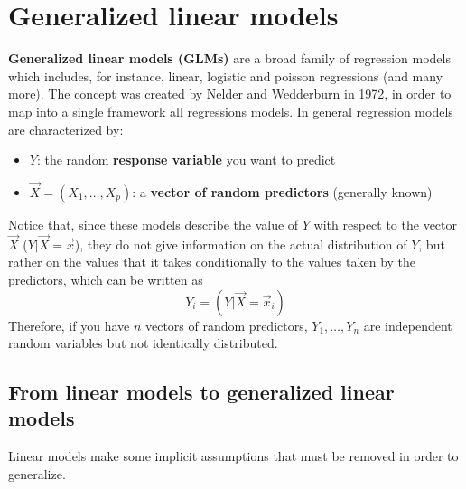 \chapter{Generalized linear models}
  \textbf{Generalized linear models (GLMs)} are a broad family of regression models which includes, for instance, linear, logistic and poisson regressions (and many more). The concept was created by Nelder and Wedderburn in 1972, in order to map into a single framework all regressions models.
  In general regression models are characterized by:
  \begin{itemize}
    \item $Y$: the random \textbf{response variable} you want to predict
    \item $\vec{X}=(X_1, \dots, X_p)$: a \textbf{vector of random predictors} (generally known)
  \end{itemize}
  Notice that, since these models describe the value of $Y$ with respect to the vector $\vec{X}$ ($Y|\vec{X}=\vec{x}$), they do not give information on the actual distribution of $Y$, but rather on the values that it takes conditionally to the values taken by the predictors, which can be written as
  $$Y_i=(Y|\vec{X}=\vec{x}_i)$$
  Therefore, if you have $n$ vectors of random predictors, $Y_1, \dots, Y_n$ are independent random variables but not identically distributed.

  \section{From linear models to generalized linear models}
    Linear models make some implicit assumptions that must be removed in order to generalize.
    
